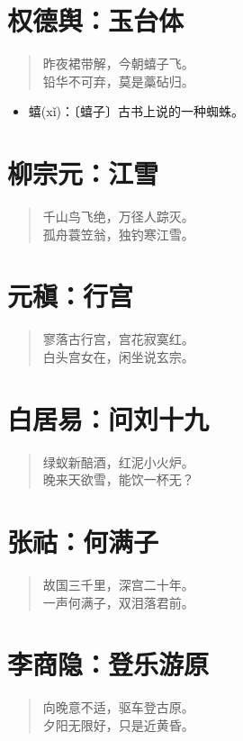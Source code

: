 \documentclass[12pt,oneside]{book}
\newenvironment{shici}{%
\begin{verse}\centering\yanti\large\hspace{12pt}}{\end{verse}}
\begin{document}
\begin{common-format}
\chapter{权德舆：玉台体}
\begin{shici}
昨夜裙带解，今朝蟢子飞。\\
铅华不可弃，莫是藁砧归。
\end{shici}

\begin{itemize}
\item 蟢(xǐ)：〔蟢子〕古书上说的一种蜘蛛。
\end{itemize}


\chapter{柳宗元：江雪}
\begin{shici}
千山鸟飞绝，万径人踪灭。\\
孤舟蓑笠翁，独钓寒江雪。
\end{shici}

\chapter{元稹：行宫}
\begin{shici}
寥落古行宫，宫花寂寞红。\\
白头宫女在，闲坐说玄宗。
\end{shici}

\chapter{白居易：问刘十九}
\begin{shici}
绿蚁新醅酒，红泥小火炉。\\
晚来天欲雪，能饮一杯无？
\end{shici}

\chapter{张祜：何满子}
\begin{shici}
故国三千里，深宫二十年。\\
一声何满子，双泪落君前。
\end{shici}

\chapter{李商隐：登乐游原}
\begin{shici}
向晚意不适，驱车登古原。\\
夕阳无限好，只是近黄昏。
\end{shici}


\end{common-format}
\end{document}
